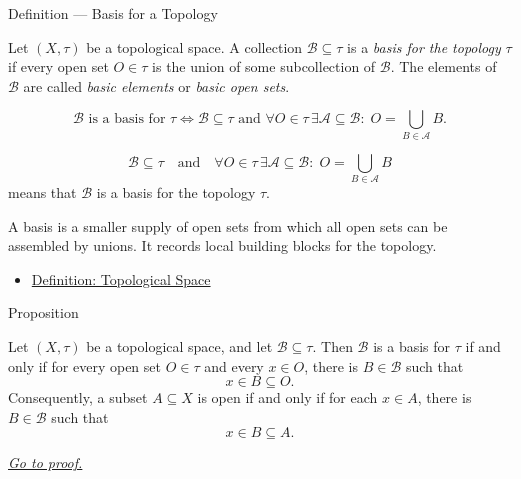 \begin{definitionbox}{Definition --- Basis for a Topology}
\begin{definition}\label{def:topological-basis}
Let \((X,\tau)\) be a topological space.  A collection
\(\mathcal{B}\subseteq\tau\) is a \emph{basis for the topology} \(\tau\) if
every open set \(O\in\tau\) is the union of some subcollection of
\(\mathcal{B}\).  The elements of \(\mathcal{B}\) are called
\emph{basic elements} or \emph{basic open sets}.
\end{definition}
\end{definitionbox}

\begin{remark*}
\[
\mathcal{B}\text{ is a basis for }\tau
\Longleftrightarrow
\mathcal{B}\subseteq\tau
\text{ and }
\forall O\in\tau\,\exists\mathcal{A}\subseteq\mathcal{B}{:}\;
O=\bigcup_{B\in\mathcal{A}}B.
\]
\end{remark*}

\begin{remark*}
\[
\mathcal{B}\subseteq\tau
\quad\text{and}\quad
\forall O\in\tau\,\exists\mathcal{A}\subseteq\mathcal{B}{:}\;
O=\bigcup_{B\in\mathcal{A}}B
\]
means that \(\mathcal{B}\) is a basis for the topology \(\tau\).
\end{remark*}

\begin{remark*}[Interpretation]
A basis is a smaller supply of open sets from which all open sets can be
assembled by unions.  It records local building blocks for the topology.
\end{remark*}

\begin{dependencies}
\begin{itemize}
  \item \hyperref[def:topological-space]{Definition: Topological Space}
\end{itemize}
\end{dependencies}

\begin{propositionbox}{Proposition}
\begin{proposition}
\label{prop:topological-basis-pointwise-characterization}
Let \((X,\tau)\) be a topological space, and let
\(\mathcal{B}\subseteq\tau\).  Then \(\mathcal{B}\) is a basis for \(\tau\)
if and only if for every open set \(O\in\tau\) and every \(x\in O\), there is
\(B\in\mathcal{B}\) such that
\[
  x\in B\subseteq O.
\]
Consequently, a subset \(A\subseteq X\) is open if and only if for each
\(x\in A\), there is \(B\in\mathcal{B}\) such that
\[
  x\in B\subseteq A.
\]

\smallskip
\noindent
\hyperref[prf:topological-basis-pointwise-characterization]{\textit{Go to proof.}}
\end{proposition}
\end{propositionbox}

